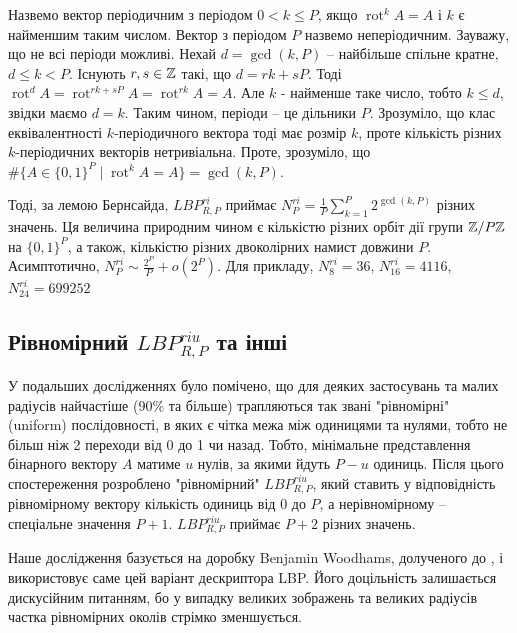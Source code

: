 Назвемо вектор періодичним з періодом $0<k\le P$, якщо $\operatorname{rot}^k A = A$ і $k$ є найменшим таким числом.
Вектор з періодом $P$ назвемо неперіодичним.
Зауважу, що не всі періоди можливі. Нехай $d=\operatorname{gcd}(k,P)$ -- найбільше спільне кратне, $d\le k < P$. 
Існують $r,s\in \mathbb Z$ такі, що $d=rk+sP$. Тоді $\operatorname{rot}^d A = \operatorname{rot}^{rk+sP} A = \operatorname{rot}^{rk} A = A$.
Але $k$ - найменше таке число, тобто $k \le d$, звідки маємо $d=k$. Таким чином, періоди -- це дільники $P$.
Зрозуміло, що клас еквівалентності $k$-періодичного вектора тоді має розмір $k$, проте кількість різних $k$-періодичних векторів нетривіальна.
Проте, зрозуміло, що $\# \{A\in \{0,1\}^P \mid \operatorname{rot}^k A = A\} = \operatorname{gcd}(k,P)$.  

Тоді, за лемою Бернсайда, $LBP^{ri}_{R,P}$ приймає $N^{ri}_P = \frac{1}{P}\sum_{k=1}^P 2^{\operatorname{gcd}(k,P)}$ різних значень. 
Ця величина природним чином є кількістю різних орбіт дії групи $\mathbb Z/P\mathbb Z$ на $\{0,1\}^P$, а також, кількістю різних двоколірних намист довжини $P$.
Асимптотично, $N^{ri}_P \sim \frac{2^P}{P} + o(2^P)$. 
Для прикладу, $N^{ri}_8 = 36$, $N^{ri}_{16} = 4116$, $N^{ri}_{24} = 699252$

\subsection{Рівномірний \(LBP_{R,P}^{riu}\) та інші}\label{section1.1d}\hfill

У подальших дослідженнях \cite{ojala2002} було помічено, що для деяких застосувань та малих радіусів найчастіше (90\% та більше) трапляються так звані "рівномірні"{} (uniform) послідовності, 
в яких є чітка межа між одиницями та нулями, тобто не більш ніж 2 переходи від 0 до 1 чи назад. 
Тобто, мінімальне представлення бінарного вектору $A$ матиме $u$ нулів, за якими йдуть $P-u$ одиниць.
Після цього спостереження розроблено "рівномірний"{} $LBP^{riu}_{R,P}$, 
який ставить у відповідність рівномірному вектору кількість одиниць від $0$ до $P$, а нерівномірному -- спеціальне значення $P+1$.
$LBP^{riu}_{R,P}$ приймає $P+2$ різних значень.

Наше дослідження \cite{fastlbp2024} базується на доробку Benjamin Woodhams, долученого до \cite{lee2025integrated}, і використовує саме цей варіант дескриптора LBP.
Його доцільність залишається дискусійним питанням, бо у випадку великих зображень та великих радіусів 
частка рівномірних околів стрімко зменшується.

